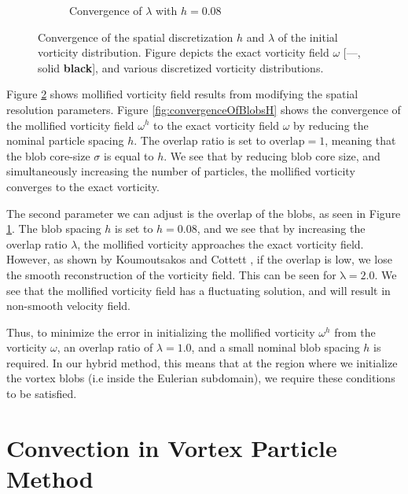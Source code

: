\begin{figure}[!b]
\begin{subfigure}[b]{0.45\textwidth}
                \caption{Convergence of $\lambda$ with $h = 0.08$}
                \label{fig:convergenceOfBlobsOverlap}
        \end{subfigure}
        \caption{Convergence of the spatial discretization $h$ and $\lambda$ of the initial vorticity distribution. Figure depicts the exact vorticity field $\omega$ [---, solid \textbf{black}], and various discretized vorticity distributions.}
        \label{fig:convergenceOfSpatialResolution}
\end{figure}	

Figure \ref{fig:convergenceOfSpatialResolution} shows mollified vorticity field results from modifying the spatial resolution parameters. Figure \ref{fig:convergenceOfBlobsH} shows the convergence of the mollified vorticity field $\omega^h$ to the exact vorticity field $\omega$ by reducing the nominal particle spacing $h$. The overlap ratio is set to $\mathrm{overlap} = 1$, meaning that the blob core-size $\sigma$ is equal to $h$. We see that by reducing blob core size, and simultaneously increasing the number of particles, the mollified vorticity converges to the exact vorticity. 

The second parameter we can adjust is the $\mathrm{overlap}$ of the blobs, as seen in Figure \ref{fig:convergenceOfBlobsOverlap}. The blob spacing $h$ is set to $h = 0.08$, and we see that by increasing the overlap ratio $\lambda$, the mollified vorticity approaches the exact vorticity field. However, as shown by Koumoutsakos and Cottett \cite{Cottet2000a}, if the overlap is low, we lose the smooth reconstruction of the vorticity field. This can be seen for $\mathrm{\lambda} = 2.0$. We see that the mollified vorticity field has a fluctuating solution, and will result in non-smooth velocity field.

Thus, to minimize the error in initializing the mollified vorticity $\omega^h$ from the vorticity $\omega$, an overlap ratio of $\lambda = 1.0$, and a small nominal blob spacing $h$ is required. In our hybrid method, this means that at the region where we initialize the vortex blobs (i.e inside the Eulerian subdomain), we require these conditions to be satisfied. 

\section{Convection in Vortex Particle Method}
\label{sec:covb}


